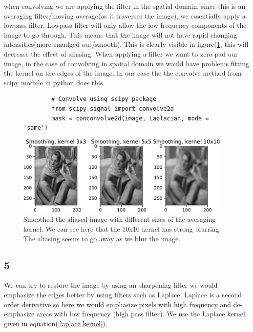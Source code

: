 {when convolving we are applying the filter in the spatial domain, since this is an averaging filter/moving average(as it traverses the image), we essentially apply a lowpass filter. Lowpass filter will only allow the low frequency components of the image to go through. This means that the image will not have rapid changing intensities(more smudged out/smooth). This is clearly visible in figure(\ref{smooth}, this will decrease the effect of aliasing.
When applying a filter we want to zero pad our image, in the case of convolving in spatial domain we would have problems fitting the kernel on the edges of the image. In our case the the convolve method from scipy module in python does this.

\begin{figure}[!htb]
    \begin{lstlisting}
        # Convolve using scipy package
        from scipy.signal import convolve2d
        mask = conconvolve2d(image, Laplacian, mode = 'same')
    \end{lstlisting}
\end{figure}

\begin{figure}[!htb]
    {\centering
        \includegraphics[width=0.95\textwidth]{smoothing.pdf}
        \caption{Smoothed the aliased image with different sizes of the averaging kernel. We can see here that the 10x10 kernel has strong blurring. The aliasing seems to go away as we blur the image.}
        \label{smooth}
    \par}
    \end{figure}

\subsection{5}

We can try to restore the image by using an sharpening filter we would emphasize the edges better by using filters such as Laplace. Laplace is a second order derivative so here we would emphasize pixels with high frequency and de-emphasize areas with low frequency (high pass filter). We use the Laplace kernel given in equation(\ref{laplace kernel}),

}
